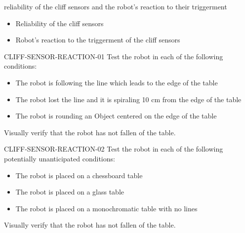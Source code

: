 \begin{itemize}
        {reliability of the cliff sensors and the robot's reaction to their triggerment}
        {
            \begin{itemize}
                \item Reliability of the cliff sensors
                \item Robot's reaction to the triggerment of the cliff sensors
            \end{itemize}
        }
        {
            \item CLIFF-SENSOR-REACTION-01 \quad Test the robot in each of the following conditions:
            \begin{itemize}
                \item The robot is following the line which leads to the edge of the table
                \item The robot lost the line and it is spiraling 10 cm from the edge of the table
                \item The robot is rounding an Object centered on the edge of the table
            \end{itemize}
            Visually verify that the robot has not fallen of the table.
            \item CLIFF-SENSOR-REACTION-02 \quad Test the robot in each of the following potentially unanticipated conditions:
            \begin{itemize}
                \item The robot is placed on a chessboard table
                \item The robot is placed on a glass table
                \item The robot is placed on a monochromatic table with no lines
            \end{itemize}
            Visually verify that the robot has not fallen of the table.
        }
\end{itemize}






